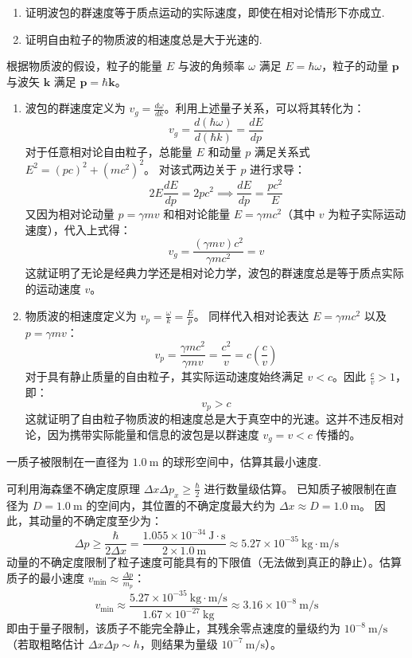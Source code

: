 \begin{exercise}\label{ex:23.7}
\begin{enumerate}
  \item[(a)] 证明波包的群速度等于质点运动的实际速度，即使在相对论情形下亦成立. 
  \item[(b)] 证明自由粒子的物质波的相速度总是大于光速的.
\end{enumerate}
\end{exercise}
\begin{solution}
根据物质波的假设，粒子的能量 $E$ 与波的角频率 $\omega$ 满足 $E = \hbar \omega$，粒子的动量 $\boldsymbol{p}$ 与波矢 $\boldsymbol{k}$ 满足 $\boldsymbol{p} = \hbar \boldsymbol{k}$。

\begin{enumerate}
    \item[(a)] 波包的群速度定义为 $v_g = \frac{d\omega}{dk}$。利用上述量子关系，可以将其转化为：
    $$ v_g = \frac{d(\hbar \omega)}{d(\hbar k)} = \frac{dE}{dp} $$
    对于任意相对论自由粒子，总能量 $E$ 和动量 $p$ 满足关系式 $E^2 = (pc)^2 + (mc^2)^2$。
    对该式两边关于 $p$ 进行求导：
    $$ 2E \frac{dE}{dp} = 2pc^2 \implies \frac{dE}{dp} = \frac{pc^2}{E} $$
    又因为相对论动量 $p = \gamma m v$ 和相对论能量 $E = \gamma m c^2$（其中 $v$ 为粒子实际运动速度），代入上式得：
    $$ v_g = \frac{(\gamma m v) c^2}{\gamma m c^2} = v $$
    这就证明了无论是经典力学还是相对论力学，波包的群速度总是等于质点实际的运动速度 $v$。

    \item[(b)] 物质波的相速度定义为 $v_p = \frac{\omega}{k} = \frac{E}{p}$。
    同样代入相对论表达 $E = \gamma m c^2$ 以及 $p = \gamma m v$：
    $$ v_p = \frac{\gamma m c^2}{\gamma m v} = \frac{c^2}{v} = c \left( \frac{c}{v} \right) $$
    对于具有静止质量的自由粒子，其实际运动速度始终满足 $v < c$。因此 $\frac{c}{v} > 1$，即：
    $$ v_p > c $$
    这就证明了自由粒子物质波的相速度总是大于真空中的光速。这并不违反相对论，因为携带实际能量和信息的波包是以群速度 $v_g = v < c$ 传播的。
\end{enumerate}
\end{solution}

\begin{exercise}\label{ex:23.8}
一质子被限制在一直径为 $1.0 \ \mathrm{m}$ 的球形空间中，估算其最小速度.
\end{exercise}
\begin{solution}
可利用海森堡不确定度原理 $\Delta x \Delta p_x \ge \frac{\hbar}{2}$ 进行数量级估算。
已知质子被限制在直径为 $D = 1.0 \ \mathrm{m}$ 的空间内，其位置的不确定度最大约为 $\Delta x \approx D = 1.0 \ \mathrm{m}$。
因此，其动量的不确定度至少为：
$$ \Delta p \ge \frac{\hbar}{2\Delta x} = \frac{1.055 \times 10^{-34} \ \mathrm{J \cdot s}}{2 \times 1.0 \ \mathrm{m}} \approx 5.27 \times 10^{-35} \ \mathrm{kg \cdot m/s} $$
动量的不确定度限制了粒子速度可能具有的下限值（无法做到真正的静止）。估算质子的最小速度 $v_{\min} \approx \frac{\Delta p}{m_p}$：
$$ v_{\min} \approx \frac{5.27 \times 10^{-35} \ \mathrm{kg \cdot m/s}}{1.67 \times 10^{-27} \ \mathrm{kg}} \approx 3.16 \times 10^{-8} \ \mathrm{m/s} $$
即由于量子限制，该质子不能完全静止，其残余零点速度的量级约为 $10^{-8} \ \mathrm{m/s}$（若取粗略估计 $\Delta x \Delta p \sim h$，则结果为量级 $10^{-7} \ \mathrm{m/s}$）。
\end{solution}

